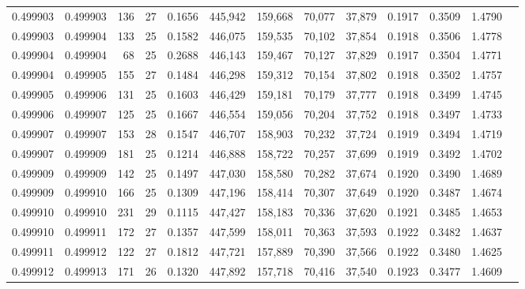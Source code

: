 \begin{tabular}{rrrrrrrrrrrrr}
0.499903 & 0.499903 & 136 &  27 &                                     0.1656 & 445,942 & 159,668 &  70,077 &  37,879 & 0.1917 & 0.3509 & 1.4790 \\
0.499903 & 0.499904 & 133 &  25 &                                     0.1582 & 446,075 & 159,535 &  70,102 &  37,854 & 0.1918 & 0.3506 & 1.4778 \\
0.499904 & 0.499904 &  68 &  25 &                                     0.2688 & 446,143 & 159,467 &  70,127 &  37,829 & 0.1917 & 0.3504 & 1.4771 \\
0.499904 & 0.499905 & 155 &  27 &                                     0.1484 & 446,298 & 159,312 &  70,154 &  37,802 & 0.1918 & 0.3502 & 1.4757 \\
0.499905 & 0.499906 & 131 &  25 &                                     0.1603 & 446,429 & 159,181 &  70,179 &  37,777 & 0.1918 & 0.3499 & 1.4745 \\
0.499906 & 0.499907 & 125 &  25 &                                     0.1667 & 446,554 & 159,056 &  70,204 &  37,752 & 0.1918 & 0.3497 & 1.4733 \\
0.499907 & 0.499907 & 153 &  28 &                                     0.1547 & 446,707 & 158,903 &  70,232 &  37,724 & 0.1919 & 0.3494 & 1.4719 \\
0.499907 & 0.499909 & 181 &  25 &                                     0.1214 & 446,888 & 158,722 &  70,257 &  37,699 & 0.1919 & 0.3492 & 1.4702 \\
0.499909 & 0.499909 & 142 &  25 &                                     0.1497 & 447,030 & 158,580 &  70,282 &  37,674 & 0.1920 & 0.3490 & 1.4689 \\
0.499909 & 0.499910 & 166 &  25 &                                     0.1309 & 447,196 & 158,414 &  70,307 &  37,649 & 0.1920 & 0.3487 & 1.4674 \\
0.499910 & 0.499910 & 231 &  29 &                                     0.1115 & 447,427 & 158,183 &  70,336 &  37,620 & 0.1921 & 0.3485 & 1.4653 \\
0.499910 & 0.499911 & 172 &  27 &                                     0.1357 & 447,599 & 158,011 &  70,363 &  37,593 & 0.1922 & 0.3482 & 1.4637 \\
0.499911 & 0.499912 & 122 &  27 &                                     0.1812 & 447,721 & 157,889 &  70,390 &  37,566 & 0.1922 & 0.3480 & 1.4625 \\
0.499912 & 0.499913 & 171 &  26 &                                     0.1320 & 447,892 & 157,718 &  70,416 &  37,540 & 0.1923 & 0.3477 & 1.4609 \\

\end{tabular}
